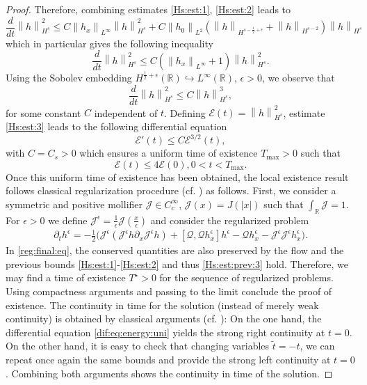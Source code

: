 \documentclass[final,11pt,a4paper,reqno]{amsart}
\newcommand{\norm}[1]{\left\| #1 \right\|}
\newcommand{\RR}{\mathbb R}
\newcommand{\pa}{\partial}
\theoremstyle{definition}
\begin{document}
\begin{proof}
Therefore, combining estimates \eqref{Hs:est:1}, \eqref{Hs:est:2} leads to
\begin{equation}\label{Hs:est:prev:3}
\frac{d}{dt}\norm{h}_{H^{s}}^{2}\leq C \norm{h_{x}}_{L^{\infty}}  \norm{h}_{H^{s}}^{2}+C \norm{h_{0}}_{L^{2}} \left(\norm{h}_{H^{s-\frac{1}{2}+\epsilon}}+\norm{h}_{H^{s-2}}\right) \norm{h}_{H^{s}}
\end{equation}
which in particular gives the following inequality
\begin{equation}\label{Hs:est:prev:4}
\frac{d}{dt}\norm{h}_{H^{s}}^{2}\leq C \left(\norm{h_{x}}_{L^{\infty}}+ 1 \right)  \norm{h}_{H^{s}}^{2}.
\end{equation}
Using the Sobolev embedding  $H^{\frac{1}{2}+\epsilon}(\RR)\hookrightarrow L^{\infty}(\RR)$, $\epsilon>0$, we observe that
\begin{equation}\label{Hs:est:3}
\frac{d}{dt}\norm{h}_{H^{s}}^{2}\leq C \norm{h}_{H^{s}}^{3},
\end{equation}
for some constant $C$ independent of $t$.
Defining $\mathcal{E}(t)=\norm{h}_{H^{s}}^{2}$, estimate \eqref{Hs:est:3} leads to the following differential equation
\begin{equation}\label{dif:eq:energy:uni}
	 \mathcal{E}'(t)\leq C\mathcal{E}^{3/2}(t), 
  \end{equation}
with $C=C_{s}>0$  which ensures a uniform time of existence $T_{\max}>0$ such that
\[ \mathcal{E}(t)\leq 4\mathcal{E}(0), 0<t<T_{\max}.\]
Once this uniform time of existence has been obtained, the local existence result follows classical regularization procedure (cf. \cite{Majda-Bertozzi-2001}) as follows. First, we consider a symmetric and positive mollifier $\mathcal{J}\in C^{\infty}_{c}$, $\mathcal{J}(x)=J(|x|)$ such that $\int_{\RR}
\mathcal{J}=1$. For $\epsilon>0$ we define $\mathcal{J}^{\epsilon}= \frac{1}{\epsilon}\mathcal{J}(\frac{x}{\epsilon})$ and consider the regularized problem
\begin{align}\label{reg:final:eq}
\pa_{t}h^{\epsilon}=-\frac{1}{2}\big(\mathcal{J}^{\epsilon}(\mathcal{J}^{\epsilon}h \partial_{x}\mathcal{J}^{\epsilon}h) + [\mathscr{Q},\mathscr{Q}h^{\epsilon}_{x}]h^{\epsilon} - \mathscr{Q}h^{\epsilon}_{x}-\mathcal{J}^{\epsilon}\mathcal{J}^{\epsilon}h^{\epsilon}_{x} \big).
\end{align}
In \eqref{reg:final:eq}, the conserved quantities are also preserved by the flow  and the previous bounds \eqref{Hs:est:1}-\eqref{Hs:est:2} and thus \eqref{Hs:est:prev:3} hold. Therefore, we may find a time of existence $T^{\star}>0$ for the sequence of regularized problems. 
Using  compactness arguments and passing to the limit conclude the proof of existence.  
The continuity in time for the solution (instead of merely weak continuity) is obtained by classical arguments (cf. \cite{Majda-Bertozzi-2001}): On the one hand, the differential equation \eqref{dif:eq:energy:uni} yields the strong right continuity at $t=0$. On the other hand, it is easy to check that changing variables $\tilde{t}=-t$, we can repeat once again the same bounds and provide the strong left continuity at $t=0$. Combining both arguments shows the continuity in time of the solution.


\end{proof}
\end{document}
